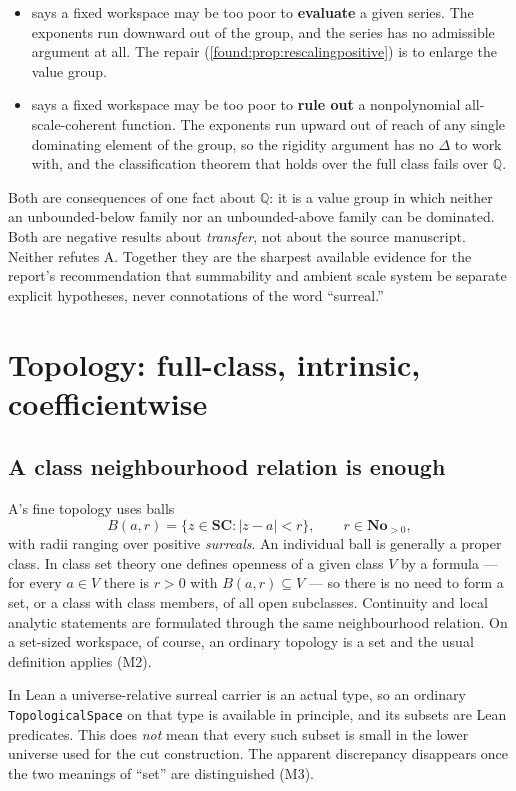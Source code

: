 \documentclass[11pt,letterpaper]{article}
\numberwithin{equation}{section}
\theoremstyle{definition}
\theoremstyle{remark}
\newcommand{\No}{\mathbf{No}}
\newcommand{\SC}{\mathbf{SC}}
\newcommand{\Q}{\mathbb Q}
\begin{document}
\begin{itemize}
\item {} says a fixed workspace may be too poor to
\textbf{evaluate} a given series. The exponents run downward out of the group,
and the series has no admissible argument at all. The repair
(\cref{found:prop:rescalingpositive}) is to enlarge the value group.
\item {} says a fixed workspace may be too poor to
\textbf{rule out} a nonpolynomial all-scale-coherent function. The exponents run
upward out of reach of any single dominating element of the group, so the
rigidity argument has no $\Delta$ to work with, and the classification theorem
that holds over the full class fails over $\Q$.
\end{itemize}

Both are consequences of one fact about $\Q$: it is a value group in which
neither an unbounded-below family nor an unbounded-above family can be
dominated. Both are negative results about \emph{transfer}, not about the source
manuscript. Neither refutes A. Together they are the sharpest available evidence
for the report's recommendation that summability and ambient scale system be
separate explicit hypotheses, never connotations of the word ``surreal.''
\section{Topology: full-class, intrinsic, coefficientwise}
\label{found:sec:topology}

\subsection{A class neighbourhood relation is enough}
\label{found:sub:neighbourhood}
A's fine topology uses balls
\[
 B(a,r)=\{z\in\SC:|z-a|<r\},\qquad r\in\No_{>0},
\]
with radii ranging over positive \emph{surreals}. An individual ball is
generally a proper class. In class set theory one defines openness of a given
class $V$ by a formula --- for every $a\in V$ there is $r>0$ with
$B(a,r)\subseteq V$ --- so there is no need to form a set, or a class with class
members, of all open subclasses. Continuity and local analytic statements are
formulated through the same neighbourhood relation. On a set-sized workspace, of
course, an ordinary topology is a set and the usual definition applies (M2).

In Lean a universe-relative surreal carrier is an actual type, so an ordinary
\texttt{TopologicalSpace} on that type is available in principle, and its
subsets are Lean predicates. This does \emph{not} mean that every such subset is
small in the lower universe used for the cut construction. The apparent
discrepancy disappears once the two meanings of ``set'' are distinguished (M3).
\end{document}
